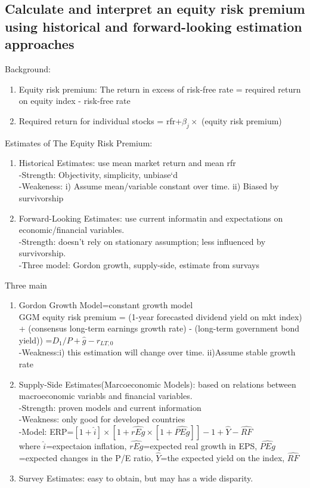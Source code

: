 \documentclass{article}
\newcommand{\be}{\begin{enumerate}}
\newcommand{\ee}{\end{enumerate}}
\begin{document}
\subsection{Calculate and interpret an equity risk premium using historical and forward-looking
estimation approaches}
Background:
\be
    \item Equity risk premium: The return in excess of risk-free rate = required return on equity
    index - risk-free rate
    \item Required return for individual stocks = rfr+$\beta_j\times$ (equity risk premium)
\ee
Estimates of The Equity Risk Premium:
\be
    \item Historical Estimates: use mean market return and mean rfr
        \\-Strength: Objectivity, simplicity, unbiase`d
        \\-Weakeness: i) Assume mean/variable constant over time. ii) Biased by survivorship
    \item Forward-Looking Estimates: use current informatin and expectations on
        economic/financial variables.
        \\-Strength: doesn't rely on stationary assumption; less influenced by
        survivorship.
        \\-Three model: Gordon growth, supply-side, estimate from survays
\ee

Three main
\be
    \item Gordon Growth Model=constant growth model
        \\GGM equity risk premium = (1-year forecasted dividend yield on mkt index)
        + (consensus long-term earnings growth rate) - (long-term government bond yield))
        =$D_1/P + \hat{g}-r_{LT,0}$
        \\-Weakness:i) this estimation will change over time. ii)Assume stable growth rate
    \item Supply-Side Estimates(Marcoeconomic Models): based on relations between
        macroeconomic variabls and financial variables.
        \\-Strength: proven models and current information
        \\-Weakness: only good for developed countries
        \\-Model: ERP=$[1+\hat{i}]\times[1+\hat{rEg}\times[1+\hat{PEg}]]-1+\hat{Y}
        -\hat{RF}$
        \\where $\hat{i}$=expectaion inflation, $\hat{rEg}$=expected real growth in EPS,
        $\hat{PEg}$=expected changes in the P/E ratio, $\hat{Y}$=the expected yield on the index,
        $\hat{RF}$
    \item Survey Estimates: easy to obtain, but may has a wide disparity.
\ee
\end{document}
